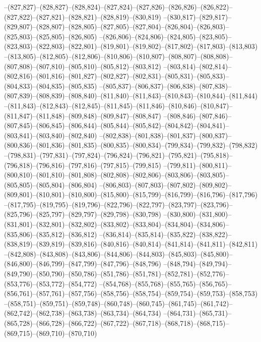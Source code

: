 --(827,827)--(828,827)--(828,824)--(827,824)--(827,826)--(826,826)--(826,822)--(827,822)--(827,821)--(828,821)--(828,819)--(830,819)
--(830,817)--(829,817)--(829,807)--(828,807)--(828,805)--(827,805)--(827,804)--(826,804)--(826,803)--(825,803)--(825,805)--(826,805)
--(826,806)--(824,806)--(824,805)--(823,805)--(823,803)--(822,803)--(822,801)--(819,801)--(819,802)--(817,802)--(817,803)--(813,803)
--(813,805)--(812,805)--(812,806)--(810,806)--(810,807)--(808,807)--(808,808)--(807,808)--(807,810)--(805,810)--(805,812)--(803,812)
--(803,814)--(802,814)--(802,816)--(801,816)--(801,827)--(802,827)--(802,831)--(805,831)--(805,833)--(804,833)--(804,835)--(805,835)
--(805,837)--(806,837)--(806,838)--(807,838)--(807,839)--(808,839)--(808,840)--(811,840)--(811,843)--(810,843)--(810,844)--(811,844)
--(811,843)--(812,843)--(812,845)--(811,845)--(811,846)--(810,846)--(810,847)--(811,847)--(811,848)--(809,848)--(809,847)--(808,847)
--(808,846)--(807,846)--(807,845)--(806,845)--(806,844)--(805,844)--(805,842)--(804,842)--(804,841)--(803,841)--(803,840)--(802,840)
--(802,838)--(801,838)--(801,837)--(800,837)--(800,836)--(801,836)--(801,835)--(800,835)--(800,834)--(799,834)--(799,832)--(798,832)
--(798,831)--(797,831)--(797,824)--(796,824)--(796,821)--(795,821)--(795,818)--(796,818)--(796,816)--(797,816)--(797,815)--(799,815)
--(799,811)--(800,811)--(800,810)--(801,810)--(801,808)--(802,808)--(802,806)--(803,806)--(803,805)--(805,805)--(805,804)--(806,804)
--(806,803)--(807,803)--(807,802)--(809,802)--(809,801)--(810,801)--(810,800)--(815,800)--(815,799)--(816,799)--(816,796)--(817,796)
--(817,795)--(819,795)--(819,796)--(822,796)--(822,797)--(823,797)--(823,796)--(825,796)--(825,797)--(829,797)--(829,798)--(830,798)
--(830,800)--(831,800)--(831,801)--(832,801)--(832,802)--(833,802)--(833,804)--(834,804)--(834,806)--(835,806)--(835,812)--(836,812)
--(836,814)--(835,814)--(835,822)--(838,822)--(838,819)--(839,819)--(839,816)--(840,816)--(840,814)--(841,814)--(841,811)--(842,811)
--(842,808)--(843,808)--(843,806)--(844,806)--(844,803)--(845,803)--(845,800)--(846,800)--(846,799)--(847,799)--(847,796)--(848,796)
--(848,794)--(849,794)--(849,790)--(850,790)--(850,786)--(851,786)--(851,781)--(852,781)--(852,776)--(853,776)--(853,772)--(854,772)
--(854,768)--(855,768)--(855,765)--(856,765)--(856,761)--(857,761)--(857,756)--(858,756)--(858,754)--(859,754)--(859,753)--(858,753)
--(858,751)--(859,751)--(859,748)--(860,748)--(860,745)--(861,745)--(861,742)--(862,742)--(862,738)--(863,738)--(863,734)--(864,734)
--(864,731)--(865,731)--(865,728)--(866,728)--(866,722)--(867,722)--(867,718)--(868,718)--(868,715)--(869,715)--(869,710)--(870,710)
